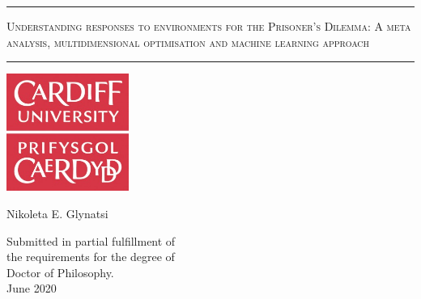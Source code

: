 \begin{titlepage}
	\begin{center}
		\vspace*{1cm}
		\vspace{10pt}

		\hrule
		\vspace{10pt}
		\huge
		\textsc{Understanding responses to environments for the Prisoner's Dilemma:
		A meta analysis, multidimensional optimisation and machine learning approach}
		\vspace{15pt}
		\hrule
		
		\vspace{2cm}

		\includegraphics[width=40mm]{cardiff_logo.jpg}
		\vspace{1cm}

		\LARGE
		Nikoleta E. Glynatsi
		
		\vspace{2cm}
		\large
		Submitted in partial fulfillment of\\ the requirements for the degree of\\[0.35em] Doctor of Philosophy. \\
		\vspace{1cm}
		June 2020

	\end{center}
\end{titlepage}